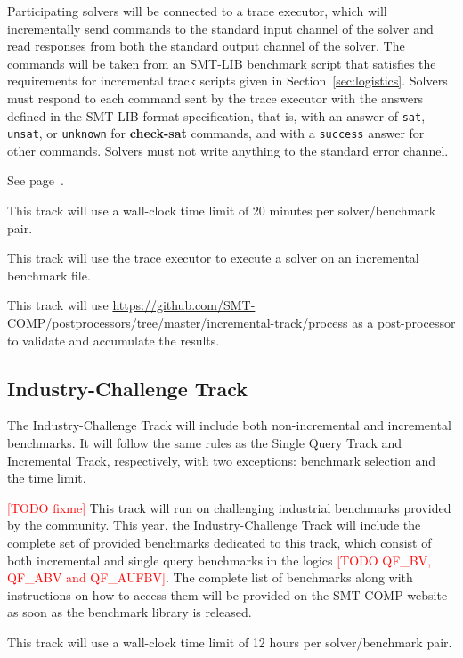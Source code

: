 \documentclass[12pt]{article}
\newcommand{\akey}[1]{\textbf{#1}\xspace}
\newcommand{\rem}[1]{\textcolor{red}{[#1]}}
\newcommand{\todo}[1]{\rem{TODO #1}}
\newcommand{\maintrack}{Single Query Track\xspace}
\newcommand{\inctrack}{Incremental Track\xspace}
\newcommand{\challtrack}{Industry-Challenge Track\xspace}
\begin{document}
Participating solvers will be connected to a trace executor, which
will incrementally send commands to the standard input channel of the
solver and read responses from both the standard output channel of the
solver.  The commands will be taken from an SMT-LIB benchmark script
that satisfies the requirements for incremental track scripts given in
Section~\ref{sec:logistics}.
%
Solvers must respond to each command sent by the trace executor with
the answers defined in the SMT-LIB format specification, that is, with
an answer of \texttt{sat}, \texttt{unsat}, or \texttt{unknown} for
\akey{check-sat} commands, and with a \texttt{success} answer for
other commands.
Solvers must not write anything to the standard error channel.

 See page~\pageref{benchmark-selection}.

This track will use a wall-clock time limit of 20 minutes per solver/benchmark
pair.

 This track will use the trace executor
to execute a solver on an incremental benchmark file.

This track will use
{\url{https://github.com/SMT-COMP/postprocessors/tree/master/incremental-track/process}}
as a post-processor
to validate and accumulate the results.

\subsection{\challtrack}
\label{sec:exec:industry-challenge}

The \challtrack will include both non-incremental and incremental benchmarks.
It will follow the same rules as the \maintrack and \inctrack, respectively,
with two exceptions: benchmark selection and the time limit.

\todo{fixme}
This track will run on challenging industrial benchmarks provided by the
community. This year, the \challtrack will include the complete set of provided
benchmarks dedicated to this track, which consist of both incremental and
single query benchmarks in the logics \todo{QF\_BV, QF\_ABV and QF\_AUFBV}. The
complete list of benchmarks along with instructions on how to access them will
be provided on the SMT-COMP website as soon as the benchmark library is
released.

This track will use a wall-clock time limit of 12 hours per solver/benchmark
pair.
\end{document}
